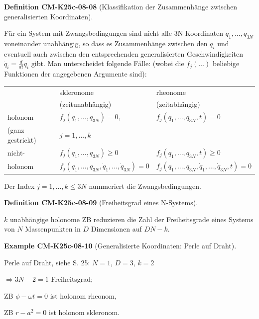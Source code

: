 \documentclass[10pt, letterpaper]{article}
\newcommand{\CustomHeading}[3]{%
  \par\medskip\noindent%
  \textbf{#1 #2} \textnormal{(#3)}.\enskip%
}
\newenvironment{DEF}[2]{\CustomHeading{Definition}{#1}{#2}}{}
\newenvironment{EXA}[2]{\CustomHeading{Example}{#1}{#2}}{}
\begin{document}
\begin{DEF}{CM-K25c-08-08}{Klassifikation der Zusammenhänge zwischen generalisierten Koordinaten}
Für ein System mit Zwangsbedingungen sind nicht alle 3N Koordinaten $q_1,...,q_{3N}$ voneinander unabhängig, so dass es Zusammenhänge zwischen den $q_i$ und eventuell auch zwischen den entsprechenden generalisierten Geschwindigkeiten $\dot{q}_i = \frac{d}{dt}q_i$ gibt. Man unterscheidet folgende Fälle: (wobei die $f_j(\dots)$ beliebige Funktionen der angegebenen Argumente sind):

\begin{tabular}{|l|l|l|}
\hline
 & skleronome & rheonome \\
 & (zeitunabhängig) & (zeitabhängig) \\
\hline
holonom & $f_j(q_1,...,q_{3N}) = 0,$ & $f_j(q_1,...,q_{3N},t) = 0$ \\
(ganz gestrickt) & $j = 1,...,k$ & \\
\hline
nicht- & $f_j(q_1,...,q_{3N}) \geq 0$ & $f_j(q_1,...,q_{3N},t) \geq 0$ \\
holonom & $f_j(q_1,...,q_{3N},\dot{q}_1,...,\dot{q}_{3N}) = 0$ & $f_j(q_1,...,q_{3N},\dot{q}_1,...,\dot{q}_{3N},t) = 0$ \\
\hline
\end{tabular}

Der Index $j = 1,...,k \leq 3N$ nummeriert die Zwangsbedingungen.
\end{DEF}

\begin{DEF}{CM-K25c-08-09}{Freiheitsgrad eines N-Systems}
$k$ unabhängige holonome ZB reduzieren die Zahl der Freiheitsgrade eines Systems von $N$ Massenpunkten in $D$ Dimensionen auf $DN-k$.
\end{DEF}

\begin{EXA}{CM-K25c-08-10}{Generalisierte Koordinaten: Perle auf Draht}
Perle auf Draht, siehe S. 25: $N=1$, $D=3$, $k=2$
   
   $\Rightarrow 3N-2 = 1$ Freiheitsgrad;
   
   ZB $\phi - \omega t = 0$ ist holonom rheonom,
   
   ZB $r-a^2 = 0$ ist holonom skleronom.
\end{EXA}
\end{document}
